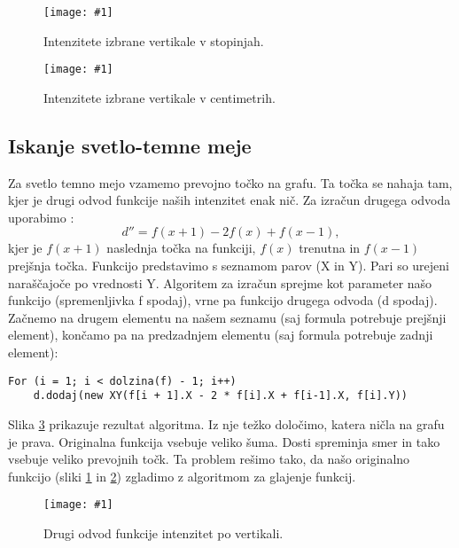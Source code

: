 \documentclass[oneside, a4paper, 12pt]{book}
\newcommand{\slika}[3]{
	\begin{figure}
	\begin{center}
	\texttt{[image: \#1]}
	\end{center}
	\vspace{-20pt}
	\caption{#2}
	\label{#3}
	\end{figure}
}
\begin{document}
\slika{slike/intenzitete.jpg}{Intenzitete izbrane vertikale v stopinjah.}{pic:intenzitete1}

\slika{slike/intenzitete-v-cm.jpg}{Intenzitete izbrane vertikale v centimetrih.}{pic:intenzitete2}

\subsection{Iskanje svetlo-temne meje}
\begin{samepage}
Za svetlo temno mejo vzamemo prevojno točko na grafu. Ta točka se nahaja tam, kjer je drugi odvod funkcije naših intenzitet enak nič. Za izračun drugega odvoda uporabimo \cite{second-d}:
\begin{equation}
d''=f(x+1) - 2f(x) + f(x-1),
\end{equation}
kjer je $f(x+1)$ naslednja točka na funkciji, $f(x)$ trenutna in $f(x-1)$ prejšnja točka. Funkcijo predstavimo s seznamom parov (X in Y). Pari so urejeni naraščajoče po vrednosti Y. Algoritem za izračun sprejme kot parameter našo funkcijo (spremenljivka f spodaj), vrne pa funkcijo drugega odvoda (d spodaj). Začnemo na drugem elementu na našem seznamu (saj formula potrebuje prejšnji element), končamo pa na predzadnjem elementu (saj formula potrebuje zadnji element):

\begin{verbatim}
For (i = 1; i < dolzina(f) - 1; i++) 
    d.dodaj(new XY(f[i + 1].X - 2 * f[i].X + f[i-1].X, f[i].Y))
\end{verbatim}
\end{samepage}

Slika \ref{pic:d2} prikazuje rezultat algoritma. Iz nje težko določimo, katera ničla na grafu je prava. Originalna funkcija vsebuje veliko šuma. Dosti spreminja smer in tako vsebuje veliko prevojnih točk. Ta problem rešimo tako, da našo originalno funkcijo (sliki \ref{pic:intenzitete1} in \ref{pic:intenzitete2}) zgladimo z algoritmom za glajenje funkcij.

\slika{slike/drugi-odvod-1.jpg}{Drugi odvod funkcije intenzitet po vertikali.}{pic:d2}
\end{document}
